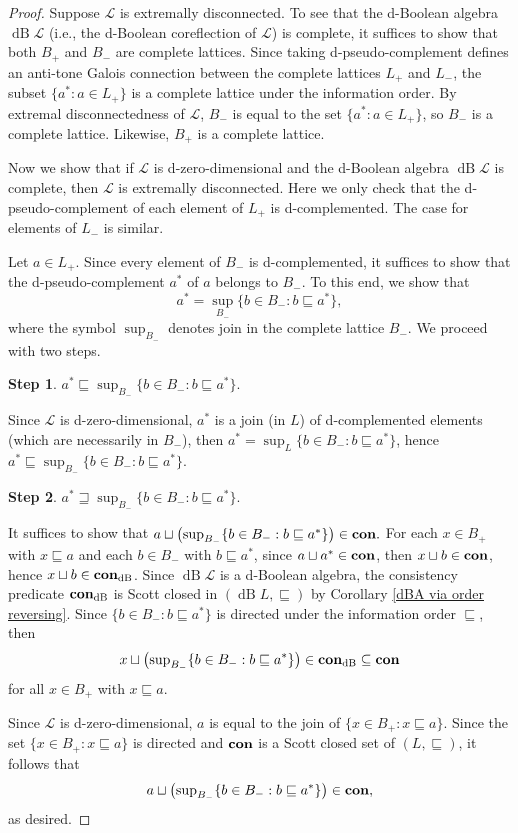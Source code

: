 \documentclass[10pt,a4paper]{amsart}
\DeclareMathOperator{\dB}{dB}
\begin{document}
\begin{proof} Suppose $\mathcal{L}$ is extremally disconnected. To see that the d-Boolean algebra $\dB\mathcal{L}$ (i.e., the d-Boolean coreflection of $\mathcal{L}$) is complete, it suffices to show that both $B_+$ and $B_-$ are complete lattices. Since taking d-pseudo-complement defines an anti-tone Galois connection between the complete lattices $L_+$ and $L_-$, the subset $\{a^*:a\in L_+\}$  is a complete lattice under the information order. By extremal disconnectedness of $\mathcal{L}$, $B_-$ is equal to the set $\{a^*:a\in L_+\}$, so $B_-$ is a complete lattice. Likewise, $B_+$ is a complete lattice. 

Now we show that if $\mathcal{L}$ is d-zero-dimensional and the d-Boolean algebra $\dB\mathcal{L}$ is complete, then $\mathcal{L}$ is extremally disconnected. Here we only check that the d-pseudo-complement  of each element of $L_+$ is d-complemented. The case for elements of $L_-$ is similar. 

Let $a\in L_+$. Since every element of $B_-$ is d-complemented, it suffices to show that the d-pseudo-complement $a^*$ of $a$ belongs to $B_-$. To this end, we show that  $$a^*={\sup}_{B_-} \{b\in B_{-}:b\sqsubseteq a^*\},$$ where the symbol ${\sup}_{B_-}$ denotes  join  in the complete lattice $B_-$. We proceed with two steps. 

{\bf Step 1}.   $a^*\sqsubseteq{\sup}_{B_-} \{b\in B_{-}:b\sqsubseteq a^*\}$. 

Since $\mathcal{L}$ is d-zero-dimensional, $a^*$ is a join (in $L$) of d-complemented elements (which are necessarily in $B_-$), then $a^*=\sup_L \{b\in B_{-}:b\sqsubseteq a^*\}$, hence $a^*\sqsubseteq{\sup}_{B_-} \{b\in B_{-}:b\sqsubseteq a^*\}.$   

{\bf Step 2}.   $a^*\sqsupseteq{\sup}_{B_-} \{b\in B_{-}:b\sqsubseteq a^*\}$. 

It suffices to show that  $a\sqcup \big({\sup}_{B_-}\{b\in B_-:b\sqsubseteq a^*\}\big)\in{\bf con}.$ 
For each $x\in B_{+}$ with $x\sqsubseteq a$ and each $b\in B_{-}$ with $b\sqsubseteq a^*$, since $a\sqcup a^*\in{\bf con}$, then $x\sqcup b\in{\bf con}$, hence $x\sqcup b\in{\bf con}_{\dB}$. Since  $\dB\mathcal{L}$ is a d-Boolean algebra, the consistency predicate ${\bf con}_{\dB}$ is Scott closed in $(\dB L,\sqsubseteq)$ by Corollary \ref{dBA via order reversing}.  Since $\{b\in B_-:b\sqsubseteq a^*\}$ is directed under the information order $\sqsubseteq$, then $$x\sqcup\big({\sup}_{B_-}\{b\in B_-:b\sqsubseteq a^*\}\big)\in {\bf con}_{\dB}\subseteq{\bf con}$$ for all $x\in B_{+}$ with $x\sqsubseteq a$.   

Since $\mathcal{L}$ is d-zero-dimensional,   $a$ is equal to the join of $\{x\in B_{+}:x\sqsubseteq a\}.$   Since the set $\{x\in B_+:x\sqsubseteq a\}$ is  directed  and ${\bf con}$ is a Scott closed set of $(L,\sqsubseteq)$,   it follows that $$a\sqcup\big({\sup}_{B_-}\{b\in B_-:b\sqsubseteq a^*\}\big)\in{\bf con}, $$ as desired.  \end{proof}
\end{document}
